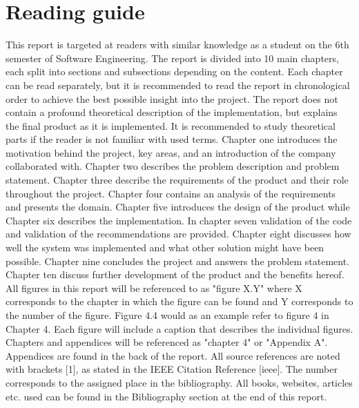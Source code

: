 
\chapter{Reading guide} %

\label{readingGuide} %


This report is targeted at readers with similar knowledge as a student on the 6th semester of
Software Engineering. The report
is divided into 10 main chapters, each split into sections and subsections depending on the content.
Each chapter can be read separately, but it is recommended to read the report in chronological order
to achieve the best possible insight into the project. The report does not contain a profound theoretical
description of the implementation, but explains the final product as it is implemented. It is
recommended to study theoretical parts if the reader is not familiar with used terms.
Chapter one introduces the motivation behind the project, key areas, and an introduction of the company collaborated with. Chapter two describes the problem description and problem statement. Chapter three describe the
requirements of the product and their role throughout the project. Chapter four contains an analysis
of the requirements and presents the domain. Chapter five introduces the design of the
product while Chapter six describes the implementation. In chapter seven validation of the code and validation of the recommendations are provided. Chapter eight discusses how well the system was implemented and what other solution might have been possible. Chapter nine concludes the project and answers the problem statement. Chapter ten discuss further development of the product and the benefits hereof.\\
All figures in this report will be referenced to as "figure X.Y" where X corresponds to the chapter in
which the figure can be found and Y corresponds to the number of the figure. Figure 4.4 would as an
example refer to figure 4 in Chapter 4. Each figure will include a caption that describes the individual
figures. Chapters and appendices will be referenced as "chapter 4" or "Appendix A". Appendices are found in the back of the report.
All source references are noted with brackets [1], as stated in the IEEE Citation Reference [ieee]. The number
corresponds to the assigned place in the bibliography. All books, websites, articles etc. used can be
found in the Bibliography section at the end of this report.
